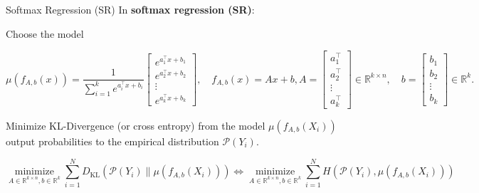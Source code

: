 \begin{frame}[allowframebreaks]

\begin{mydefinitionblock}{4.8}{Softmax Regression (SR)}
    In \textbf{softmax regression (SR)}:

    Choose the model

    $$
    \mu\left(f_{A, b}(x)\right)=\frac{1}{\sum_{i=1}^{k} e^{a_{i}^{\top} x+b_{i}}}\left[\begin{array}{c}
    e^{a_{1}^{\top} x+b_{1}} \\
    e^{a_{2}^{\top} x+b_{2}} \\
    \vdots \\
    e^{a_{k}^{\top} x+b_{k}}
    \end{array}\right], \quad f_{A, b}(x)=A x+b, A=\left[\begin{array}{c}
    a_{1}^{\top} \\
    a_{2}^{\top} \\
    \vdots \\
    a_{k}^{\top}
    \end{array}\right] \in \mathbb{R}^{k \times n}, \quad b=\left[\begin{array}{c}
    b_{1} \\
    b_{2} \\
    \vdots \\
    b_{k}
    \end{array}\right] \in \mathbb{R}^{k} .
    $$

    Minimize KL-Divergence (or cross entropy) from the model $\mu\left(f_{A, b}\left(X_{i}\right)\right)$ output probabilities to the empirical distribution $\mathcal{P}\left(Y_{i}\right)$.

    $$
    \underset{A \in \mathbb{R}^{k \times n}, b \in \mathbb{R}^{k}}{\operatorname{minimize}} \sum_{i=1}^{N} D_{\mathrm{KL}}\left(\mathcal{P}\left(Y_{i}\right) \| \mu\left(f_{A, b}\left(X_{i}\right)\right)\right) \Longleftrightarrow \underset{A \in \mathbb{R}^{k \times n}, b \in \mathbb{R}^{k}}{\operatorname{minimize}} \sum_{i=1}^{N} H\left(\mathcal{P}\left(Y_{i}\right), \mu\left(f_{A, b}\left(X_{i}\right)\right)\right)
    $$
\end{mydefinitionblock}

\end{frame}


